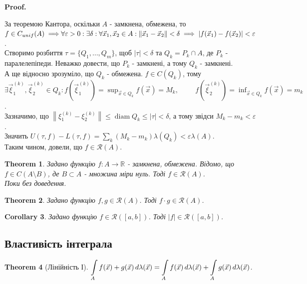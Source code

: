 \documentclass[a4paper, 10pt]{article}
\makeatletter
\DeclareMathOperator*\diam{diam}
\def\huge{\displaystyle}
\def\qed{$\blacksquare$}
\theoremstyle{theoremdd}
\newtheorem{theorem}{Theorem}[subsection]
\theoremstyle{theoremdd}
\theoremstyle{theoremdd}
\theoremstyle{theoremdd}
\theoremstyle{theoremdd}
\theoremstyle{theoremdd}
\theoremstyle{theoremdd}
\theoremstyle{theoremdd}
\newtheorem{corollary}[theorem]{Corollary}
\renewenvironment{proof}[1][Proof.\\]{\par
\pushQED{\hfill \qed}%
\normalfont \topsep6\p@\@plus6\p@\relax
\trivlist
\item\relax
{\bfseries
#1\@addpunct{.}}\hspace\labelsep\ignorespaces
}{%
\popQED\endtrivlist\@endpefalse
}
\newcommand\Norm[1]{\left\lVert#1\right\rVert}
\makeatother
\begin{document}
\begin{proof}
За теоремою Кантора, оскільки $A$ - замкнена, обмежена, то $f \in C_{unif}(A) \implies \\ \forall \varepsilon > 0: \exists \delta: \forall \vec{x}_1,\vec{x}_2 \in A: \Norm{\vec{x}_1-\vec{x}_2}<\delta \implies |f(\vec{x}_1)-f(\vec{x}_2)| < \varepsilon$.\\
Створимо розбиття $\tau = \{Q_1,\dots,Q_m\}$, щоб $|\tau| < \delta$ та $Q_k = P_k \cap A$, де $P_k$ - паралелепіпеди. Неважко довести, що $P_k$ - замкнені, а тому $Q_k$ - замкнені.\\
А ще відносно зрозуміло, що $Q_k$ - обмежена.
$f \in C(Q_k)$, тому \\
$\exists \vec{\xi}_1^{(k)},\vec{\xi}_2^{(k)} \in Q_k: f(\vec{\xi}_1^{(k)}) = \huge\sup_{\vec{x} \in Q_k} f(\vec{x}) = M_k, \hspace{1cm} f(\vec{\xi}_2^{(k)}) = \huge\inf_{\vec{x} \in Q_k} f(\vec{x}) = m_k$.\\
Зазначимо, що $\Norm{\xi_1^{(k)} - \xi_2^{(k)}} \leq \diam Q_k \leq |\tau| < \delta$, а тому звідси $M_k - m_k < \varepsilon$.\\
Значить $U(\tau,f) - L(\tau,f) = \huge\sum_k (M_k-m_k)\lambda(Q_k) < \varepsilon \lambda(A)$.\\
Таким чином, довели, що $f \in \mathcal{R}(A)$.
\end{proof}

\begin{theorem}
Задано функцію $f: A \to \mathbb{R}$ - замкнена, обмежена. Відомо, що $f \in C(A \setminus B)$, де $B \subset A$ - множина міри нуль. Тоді $f \in \mathcal{R}(A)$.\\
\textit{Поки без доведення.}
\end{theorem}

\begin{theorem}
Задано функцію $f,g \in \mathcal{R}(A)$. Тоді $f \cdot g \in \mathcal{R}(A)$.
\end{theorem}

\begin{corollary}
Задано функцію $f \in \mathcal{R}([a,b])$. Тоді $|f| \in \mathcal{R}([a,b])$.
\end{corollary}

\subsection{Властивість інтеграла}
\begin{theorem}[Лінійність І]
$\huge\int\displaylimits_A f(\vec{x})+g(\vec{x})\,d\lambda(\vec{x}) = \int\displaylimits_A f(\vec{x})\,d \lambda (\vec{x}) + \int\displaylimits_A g(\vec{x})\,d \lambda(\vec{x})$.
\end{theorem}
\end{document}
